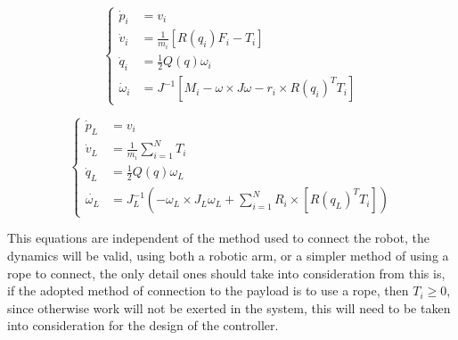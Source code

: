 \begin{equation}
    \begin{cases}
        \dot{p}_i &= v_{i} \\
        \dot{v}_i &= \frac{1}{m_i}\left[R(q_i)F_i - T_i\right] \\
        \dot{q}_i &= \frac{1}{2}Q(q) \omega_i \\
        \dot{\omega}_i &=J^{-1}\left[M_i - \omega \times J \omega - r_i \times R(q_i)^T T_i\right]
    \end{cases}
    \label{eq:Proposed Approach:Motion Model: Multiple Robot Dynamics: Robot Dynamics}
\end{equation}

\begin {equation}
    \begin{cases}
        \dot {p}_{L} &= v_{i} \\
        \dot {v}_{L} &= \frac{1}{m_{i}} \sum_{i = 1}^{N} T_{i} \\
        \dot {q}_{L} &=  \frac{1}{2} Q(q) \omega_{L} \\
        \dot{\omega_{L}} &= J_{L}^{-1} (-\omega_{L} \times J_{L} \omega_{L} + \sum_{i = 1}^{N} R_{i} \times \left[R(q_{L})^T T_{i}\right])
    \end{cases}
    \label{eq:Proposed Approach:Motion Model: Multiple Robot Dynamics: Payload Dynamics}
\end{equation}

This equations are independent of the method used to connect the robot, the dynamics will be valid, using both a robotic arm, or a simpler method of using a rope to connect, the only detail ones should take into consideration from this is, if the adopted method of connection to the payload is to use a rope, then $T_i \geq 0$, since otherwise work will not be exerted in the system, this will need to be taken into consideration for the design of the controller.